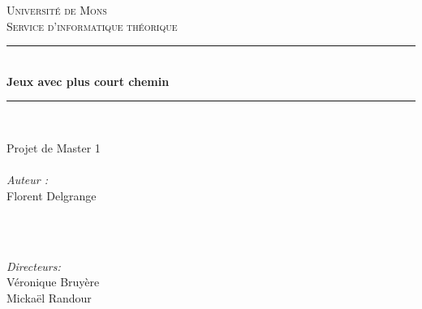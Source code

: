 \documentclass[12pt,a4paper]{report}
\theoremstyle{definition}%
\theoremstyle{remark}
\begin{document}
\begin{titlepage}
	
	\newcommand{\HRule}{\rule{\linewidth}{0.5mm}} %
	
	\center %
	
	\textsc{\LARGE Université de Mons}\\[1.5cm] %
	\textsc{\Large Service d'informatique théorique }\\[0.5cm] %
	
	\vspace{1cm}
	
	\HRule \\[0.4cm]
	{ \huge \bfseries Jeux avec plus court chemin}\\[0.4cm] %
	\HRule \\[1.5cm]
	
	\vspace{2cm}
	\begin{minipage}{0.4\textwidth}
		\begin{flushleft} \large
			Projet de Master 1\\ \quad \\
			\emph{Auteur :} \\Florent Delgrange
		\end{flushleft}
	\end{minipage}
	~
	\begin{minipage}{0.4\textwidth}
		\begin{flushright} \large
			\quad \\
			\emph{Directeurs:}\\ \quad Véronique Bruyère \\ \quad Mickaël Randour
		\end{flushright}
		
	\end{minipage}\\[5cm]
	

\end{titlepage}
\end{document}
